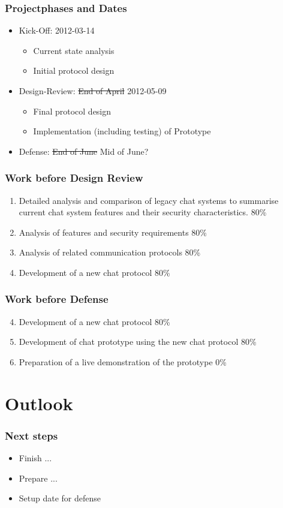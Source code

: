 \documentclass{beamer}
\begin{document}
\frame
{
  \frametitle{Projectphases and Dates}
  \begin{itemize}
     \item Kick-Off: 2012-03-14
      \begin{itemize}
         \item Current state analysis
         \item Initial protocol design
      \end{itemize}
     \item Design-Review: \sout{End of April} \alert{2012-05-09}
     \begin{itemize}
         \item Final protocol design
         \item Implementation (including testing) of Prototype
     \end{itemize}
     \item Defense: \sout{End of June} \alert{Mid of June?}
  \end{itemize}
}

\frame
{
  \frametitle{Work before Design Review}
  \begin{enumerate}
     \item Detailed analysis and comparison of legacy chat systems
        to summarise current chat system features and their
        security characteristics. \alert{80\%}
    \item Analysis of features and security requirements \alert{80\%}
    \item Analysis of related communication protocols \alert{80\%}
    \item Development of a new chat protocol \alert{80\%}
  \end{enumerate}
}
\frame
{
  \frametitle{Work before Defense}
  \begin{enumerate}
    \setcounter{enumi}{3}
    \item Development of a new chat protocol \alert{80\%}
    \item Development of chat prototype using the new chat protocol \alert{80\%}
    \item Preparation of a live demonstration of the prototype \alert{0\%}
  \end{enumerate}
}

\section{Outlook}
\frame
{
  \frametitle{Next steps}
  \begin{itemize}
    \item Finish ...
    \item Prepare ...
    \item Setup date for defense
  \end{itemize}
}
\end{document}
